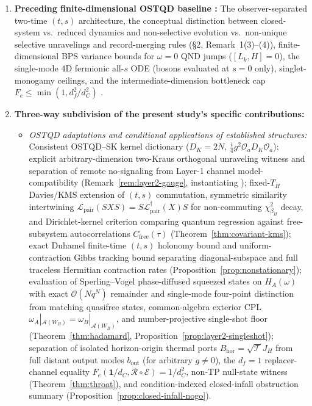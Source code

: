 \documentclass[11pt,a4paper]{article}
\theoremstyle{definition}
\theoremstyle{remark}
\newcommand{\cA}{\mathcal{A}}
\newcommand{\cL}{\mathcal{L}}
\newcommand{\cE}{\mathcal{E}}
\newcommand{\cR}{\mathcal{R}}
\newcommand{\cT}{\mathcal{T}}
\newcommand{\1}{\mathbf{1}}
\begin{document}
\begin{enumerate}
  \item \textbf{Preceding finite-dimensional OSTQD baseline \cite{Soga2026OSTQD}:} The observer-separated two-time $(t,s)$ architecture, the conceptual distinction between closed-system vs.\ reduced dynamics and non-selective evolution vs.\ non-unique selective unravelings and record-merging rules (\S2, Remark~1(3)--(4)), finite-dimensional BPS variance bounds for $\omega=0$ QND jumps ($[L_k,H]=0$), the single-mode 4D fermionic all-$s$ ODE (bosons evaluated at $s=0$ only), singlet-monogamy ceilings, and the intermediate-dimension bottleneck cap $F_e\le\min(1, d_f^2/d_C^2)$ \cite{Soga2026OSTQD,FarberGour2026}.
  \item \textbf{Three-way subdivision of the present study's specific contributions:}
  \begin{itemize}
    \item[\textbf{(A)}] \emph{OSTQD adaptations and conditional applications of established structures:} Consistent OSTQD--SK kernel dictionary ($D_K=2N$, $\frac{i}{4}g^2\mathcal{O}_a D_K\mathcal{O}_a$); explicit arbitrary-dimension two-Kraus orthogonal unraveling witness and separation of remote no-signaling from Layer-1 channel model-compatibility (Remark~\ref{rem:layer2-gauge}, instantiating \cite{WisemanDiosi2001,Soga2026OSTQD}); fixed-$T_H$ Davies/KMS extension of $(t,s)$ commutation, symmetric similarity intertwining $\cL_{\mathrm{pair}}(SXS)=S\cL_{\mathrm{pair}}^\dagger(X)S$ for non-commuting $\chi^2_{\beta_H}$ decay, and Dirichlet-kernel criterion comparing quantum regression against free-subsystem autocorrelations $C_{\mathrm{free}}(\tau)$ (Theorem~\ref{thm:covariant-kms}); exact Duhamel finite-time $(t,s)$ holonomy bound and uniform-contraction Gibbs tracking bound separating diagonal-subspace and full traceless Hermitian contraction rates (Proposition~\ref{prop:nonstationary}); evaluation of Sperling--Vogel phase-diffused squeezed states \cite{SperlingVogel2012} on $H_A(\omega)$ with exact $\mathcal{O}(Nq^N)$ remainder and single-mode four-point distinction from matching quasifree states, common-algebra exterior CPL $\omega_A|_{\cA(W_B)}=\omega_B|_{\cA(W_B)}$, and number-projective single-shot floor (Theorem~\ref{thm:hadamard}, Proposition~\ref{prop:layer2-singleshot}); separation of isolated horizon-origin thermal ports $B_{\mathrm{hor}}=\sqrt{\cT}J_H$ from full distant output modes $b_{\mathrm{out}}$ (for arbitrary $g\neq 0$), the $d_f=1$ replacer-channel equality $F_e(\1/d_C,\cR\circ\cE)=1/d_C^2$, non-TP null-state witness (Theorem~\ref{thm:throat}), and condition-indexed closed-infall obstruction summary (Proposition~\ref{prop:closed-infall-nogo}).

\end{itemize}
\end{enumerate}
\end{document}
